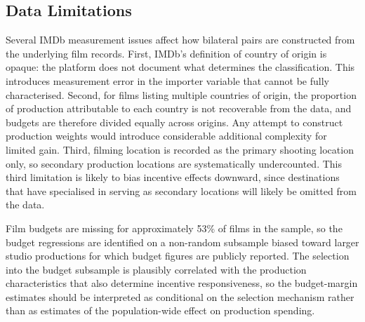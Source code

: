 %
%
%

\subsection{Data Limitations}
\label{sec:lim_data}

Several IMDb measurement issues affect how bilateral pairs are constructed from the underlying film records. First, IMDb's definition of country of origin is opaque: the platform does not document what determines the classification. This introduces measurement error in the importer variable that cannot be fully characterised. Second, for films listing multiple countries of origin, the proportion of production attributable to each country is not recoverable from the data, and budgets are therefore divided equally across origins. Any attempt to construct production weights would introduce considerable additional complexity for limited gain. Third, filming location is recorded as the primary shooting location only, so secondary production locations are systematically undercounted. This third limitation is likely to bias incentive effects downward, since destinations that have specialised in serving as secondary locations will likely be omitted from the data.

Film budgets are missing for approximately 53\% of films in the sample, so the budget regressions are identified on a non-random subsample biased toward larger studio productions for which budget figures are publicly reported. The selection into the budget subsample is plausibly correlated with the production characteristics that also determine incentive responsiveness, so the budget-margin estimates should be interpreted as conditional on the selection mechanism rather than as estimates of the population-wide effect on production spending.

